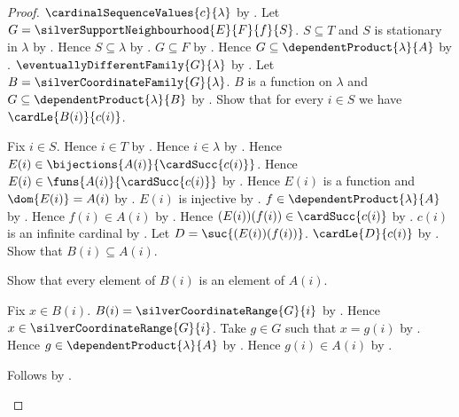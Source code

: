 \begin{proof}
    $\cardinalSequenceValues{c}{\lambda}$
        by .
    Let $G=\silverSupportNeighbourhood{E}{F}{f}{S}$.
    $S\subseteq T$ and $S$ is stationary in $\lambda$
        by .
    Hence $S\subseteq\lambda$ by .
    $G\subseteq F$ by .
    Hence $G\subseteq\dependentProduct{\lambda}{A}$
        by .
    $\eventuallyDifferentFamily{G}{\lambda}$
        by .
    Let $B=\silverCoordinateFamily{G}{\lambda}$.
    $B$ is a function on $\lambda$ and
        $G\subseteq\dependentProduct{\lambda}{B}$
        by .
    Show that for every $i\in S$ we have $\cardLe{B(i)}{c(i)}$.
    \begin{subproof}
        Fix $i\in S$.
        Hence $i\in T$ by .
        Hence $i\in\lambda$ by .
        Hence $E(i)\in\bijections{A(i)}{\cardSucc{c(i)}}$.
        Hence $E(i)\in\funs{A(i)}{\cardSucc{c(i)}}$
            by .
        Hence $E(i)$ is a function and $\dom{E(i)}=A(i)$
            by .
        $E(i)$ is injective by .
        $f\in\dependentProduct{\lambda}{A}$ by .
        Hence $f(i)\in A(i)$ by .
        Hence $(E(i))(f(i))\in\cardSucc{c(i)}$
            by .
        $c(i)$ is an infinite cardinal
            by .
        Let $D=\suc{(E(i))(f(i))}$.
        $\cardLe{D}{c(i)}$
            by .
        Show that $B(i)\subseteq A(i)$.
        \begin{subproof}
            Show that every element of $B(i)$ is an element of $A(i)$.
            \begin{subproof}
                Fix $x\in B(i)$.
                $B(i)=\silverCoordinateRange{G}{i}$
                    by .
                Hence $x\in\silverCoordinateRange{G}{i}$.
                Take $g\in G$ such that $x=g(i)$
                    by .
                Hence $g\in\dependentProduct{\lambda}{A}$ by .
                Hence $g(i)\in A(i)$
                    by .
            \end{subproof}
            Follows by .

\end{subproof}
\end{subproof}
\end{proof}
